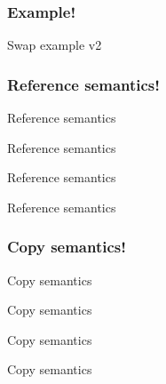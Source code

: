 \subsubsection*{Example!}
\begin{frame}{Swap example v2}
    
\end{frame}

\subsubsection*{Reference semantics!}
\begin{frame}{Reference semantics}
    
\end{frame}

\begin{frame}{Reference semantics}
    
\end{frame}
\begin{frame}{Reference semantics}
    
\end{frame}
\begin{frame}{Reference semantics}
    
\end{frame}


\subsubsection*{Copy semantics!}
\begin{frame}{Copy semantics}
    
\end{frame}
\begin{frame}{Copy semantics}
    
\end{frame}
\begin{frame}{Copy semantics}
    
\end{frame}
\begin{frame}{Copy semantics}
    
\end{frame}
